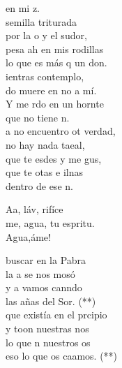 \documentclass[12pt]{article}
\begin{document}
\begin{multicols*}{2}
\begin{cancion}
            en mi z. \\
        \jump
             semilla triturada \\
            por la o y el sudor, \\
            pesa ah en mis rodillas\\
            lo que es más q un don.\\
        \jump
            ientras  contemplo, \\
            do muere en no a mí.\\
            Y me rdo en un hornte \\
            que no tiene n. \\
        \jump
            a no encuentro ot verdad,\\
             no hay nada taeal,\\
            que te esdes y me gus,\\
            que te otas e ilnas\\
            dentro de ese n.\\
        \end{cancion}%
        
        \begin{cancion}%
            Aa, láv, rifíce\\
            me, agua, tu espritu.\\
            Agua,áme!\\
        \end{cancion}%
        
        \begin{cancion}%
             buscar en la Pabra\\
            la a se nos mosó\\
            y a  vamos canndo \\
            las añas del Sor. (**) \\
        \jump
             que existía en el prcipio \\
            y toon nuestras nos\\
            lo que n nuestros os \\
            eso lo que os caamos. (**)\\
        \end{cancion}%
        

\end{multicols*}
\end{document}
